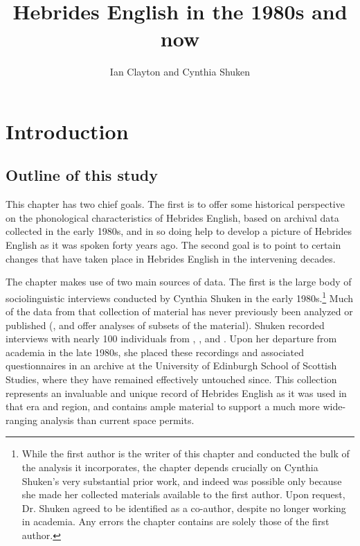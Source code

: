 \documentclass[output=paper,colorlinks,citecolor=brown]{langscibook}
\title{Hebrides English in the 1980s and now}
\author{Ian Clayton\affiliation{University of Nevada, Reno} and
    Cynthia Shuken\affiliation{Independent scholar}
    }
\begin{document}
\maketitle


\section{Introduction} 

\subsection{Outline of this study}

This chapter has two chief goals. The first is to offer some historical perspective on the phonological characteristics of Hebrides English, based on archival data collected in the early 1980s, and in so doing help to develop a picture of Hebrides English as it was spoken forty years ago. The second goal is to point to certain changes that have taken place in Hebrides English in the intervening decades. 

\newpage
The chapter makes use of two main sources of data. The first is the large body of sociolinguistic interviews conducted by Cynthia Shuken in the early 1980s.\footnote{While the first author is the writer of this chapter and conducted the bulk of the analysis it incorporates, the chapter depends crucially on Cynthia Shuken’s very substantial prior work, and indeed was possible only because she made her collected materials available to the first author. Upon request, Dr. Shuken agreed to be identified as a co-author, despite no longer working in academia. Any errors the chapter contains are solely those of the first author.} Much of the data from that collection of material has never previously been analyzed or published (\cite{Shuken:1984, Shuken:1985}, and \citeyear{Shuken:1986} offer analyses of subsets of the material). Shuken recorded interviews with nearly 100 individuals from , , and . Upon her departure from academia in the late 1980s, she placed these recordings and associated questionnaires in an archive at the University of Edinburgh School of Scottish Studies, where they have remained effectively untouched since. This collection represents an invaluable and unique record of Hebrides English as it was used in that era and region, and contains ample material to support a much more wide-ranging analysis than current space permits.
\end{document}
